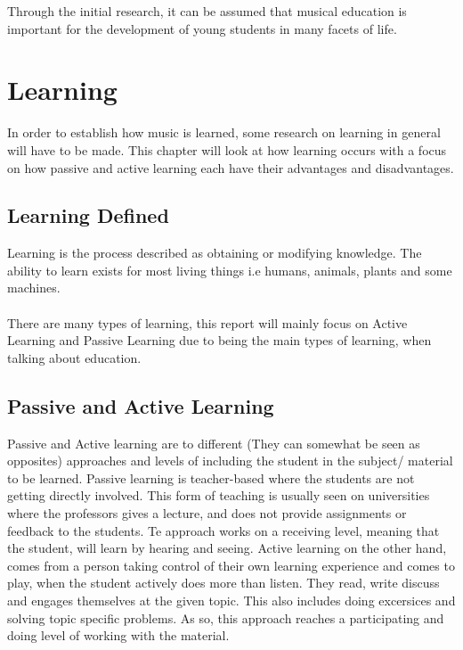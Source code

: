 Through the initial research, it can be assumed that musical education is important for the development of young students in many facets of life. 

\section{Learning}

In order to establish how music is learned, some research on learning in general will have to be made. This chapter will look at how learning occurs with a focus on how passive and active learning each have their advantages and disadvantages.

\subsection{Learning Defined}\label{sec:learning}
Learning is the process described as obtaining or modifying knowledge. The ability to learn exists for most living things i.e humans, animals, plants and some machines. \\
\\
There are many types of learning, this report will mainly focus on Active Learning and Passive Learning due to being the main types of learning, when talking about education.

\subsection*{Passive and Active Learning}\label{sec:activeLearning}
Passive and Active learning are to different (They can somewhat be seen as opposites) approaches and levels of including the student in the subject/ material to be learned. 
Passive learning is teacher-based where the students are not getting directly involved. This form of teaching is usually seen on universities where the professors gives a lecture, and does not provide assignments or feedback to the students. Te approach works on a receiving level, meaning that the student, will learn by hearing and seeing.  
Active learning on the other hand, comes from a person taking control of their own learning experience and comes to play, when the student actively does more than listen. They read, write discuss and engages themselves at the given topic. This also includes doing excersices and solving topic specific problems\cite{activelearning}. As so, this approach reaches a participating and doing level of working with the material. 

